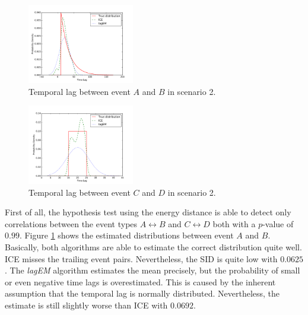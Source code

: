\documentclass[conference]{IEEEtran}
\theoremstyle{examplestyle}
\newcommand\imgsize{0.415}
\begin{document}
\begin{figure}[!tb]
	\centering
	\includegraphics[width=\imgsize\textwidth]{images/scenarios/2-AB.pdf}
	\caption{Temporal lag between event \(A\) and \(B\) in scenario 2.}
	\label{fig:scen2-1}	
\end{figure}

\begin{figure}[!tb]
	\centering
	\includegraphics[width=\imgsize\textwidth]{images/scenarios/2-CD.pdf}
	\caption{Temporal lag between event \(C\) and \(D\) in scenario 2.}
	\label{fig:scen2-2}	
\end{figure}

First of all, the hypothesis test using the energy distance is able to detect only correlations between the event types \(A \leftrightarrow B\) and \(C \leftrightarrow D\) both with a \(p\)-value of $0.99$. Figure \ref{fig:scen2-1} shows the estimated distributions between event \(A\) and \(B\). Basically, both algorithms are able to estimate the correct distribution quite well. \ac{ICE} misses the trailing event pairs. Nevertheless, the \ac{SID} is quite low with $0.0625$. The \textit{lagEM} algorithm estimates the mean precisely, but the probability of small or even negative time lags is overestimated. This is caused by the inherent assumption that the temporal lag is normally distributed. Nevertheless, the estimate is still slightly worse than \ac{ICE} with $0.0692$.
\end{document}
